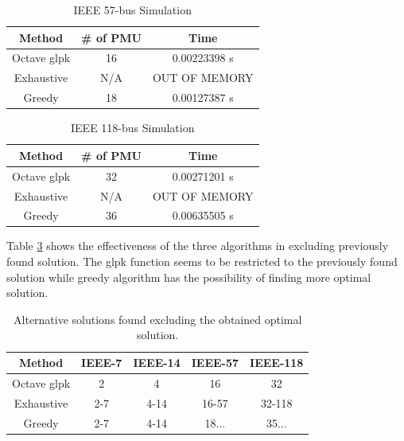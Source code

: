 \documentclass[conference]{IEEEtran}
\begin{document}
\begin{table}[htbp]
	\centering
	\caption{IEEE 57-bus Simulation}
	\label{tab:ieee57}
	\begin{tabular}{@{}|c|c|c|@{}}
		\toprule
		Method      & \# of PMU & Time          \\ \midrule
		Octave glpk & 16        & 0.00223398 s   \\ \midrule
		Exhaustive  & N/A       & OUT OF MEMORY \\ \midrule
		Greedy      & 18        & 0.00127387 s   \\ \bottomrule
	\end{tabular}
\end{table}

\begin{table}[htbp]
	\centering
	\caption{IEEE 118-bus Simulation}
	\label{tab:ieee118}
	\begin{tabular}{@{}|c|c|c|@{}}
		\toprule
		Method      & \# of PMU & Time          \\ \midrule
		Octave glpk & 32        & 0.00271201 s  \\ \midrule
		Exhaustive  & N/A       & OUT OF MEMORY \\ \midrule
		Greedy      & 36        & 0.00635505 s  \\ \bottomrule
	\end{tabular}
\end{table}

Table \ref{tab:ops} shows the effectiveness of the three algorithms in excluding previously found solution. The glpk function seems to be restricted to the previously found solution while greedy algorithm has the possibility of finding more optimal solution.

\begin{table}[]
	\centering
	\caption{Alternative solutions found excluding the obtained optimal solution.}
	\label{tab:ops}
	\begin{tabular}{@{}|c|c|c|c|c|@{}}
		\toprule
		Method      & IEEE-7  & IEEE-14 & IEEE-57 & IEEE-118 \\ \midrule
		Octave glpk & 2       & 4       & 16      & 32       \\ \midrule
		Exhaustive  & 2-7     & 4-14    & 16-57   & 32-118   \\ \midrule
		Greedy      & 2-7 & 4-14       & 18...      & 35...    \\ \bottomrule
	\end{tabular}
\end{table}
\end{document}
